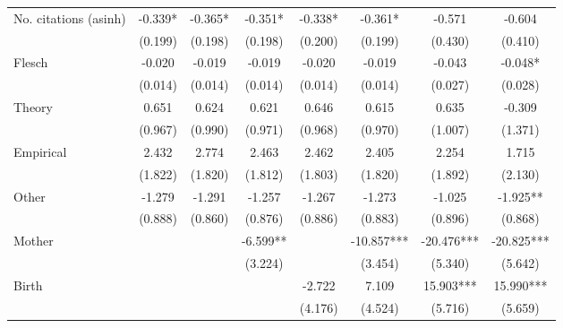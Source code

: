 \begin{table}
\begin{adjustwidth}{-0.085cm}{}
\begin{threeparttable}
\begin{tabular}{p{2.64cm}SSSSSSS}
            No. citations (asinh)         &      -0.339*  &      -0.365*  &      -0.351*  &      -0.338*  &      -0.361*  &      -0.571   &      -0.604   \\
                                          &     (0.199)   &     (0.198)   &     (0.198)   &     (0.200)   &     (0.199)   &     (0.430)   &     (0.410)   \\
            Flesch                        &      -0.020   &      -0.019   &      -0.019   &      -0.020   &      -0.019   &      -0.043   &      -0.048*  \\
                                          &     (0.014)   &     (0.014)   &     (0.014)   &     (0.014)   &     (0.014)   &     (0.027)   &     (0.028)   \\
            Theory                        &       0.651   &       0.624   &       0.621   &       0.646   &       0.615   &       0.635   &      -0.309   \\
                                          &     (0.967)   &     (0.990)   &     (0.971)   &     (0.968)   &     (0.970)   &     (1.007)   &     (1.371)   \\
            Empirical                     &       2.432   &       2.774   &       2.463   &       2.462   &       2.405   &       2.254   &       1.715   \\
                                          &     (1.822)   &     (1.820)   &     (1.812)   &     (1.803)   &     (1.820)   &     (1.892)   &     (2.130)   \\
            Other                         &      -1.279   &      -1.291   &      -1.257   &      -1.267   &      -1.273   &      -1.025   &      -1.925** \\
                                          &     (0.888)   &     (0.860)   &     (0.876)   &     (0.886)   &     (0.883)   &     (0.896)   &     (0.868)   \\
            Mother                        &               &               &      -6.599** &               &     -10.857***&     -20.476***&     -20.825***\\
                                          &               &               &     (3.224)   &               &     (3.454)   &     (5.340)   &     (5.642)   \\
            Birth                         &               &               &               &      -2.722   &       7.109   &      15.903***&      15.990***\\
                                          &               &               &               &     (4.176)   &     (4.524)   &     (5.716)   &     (5.659)   \\

\end{tabular}
\end{threeparttable}
\end{adjustwidth}
\end{table}
